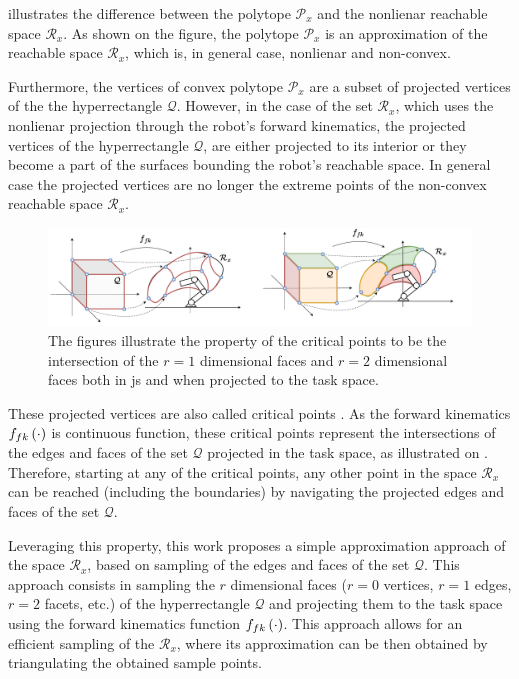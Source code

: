  illustrates the difference between the polytope $\mathcal{P}_x$ and the nonlienar reachable space $\mathcal{R}_x$. As shown on the figure, the polytope $\mathcal{P}_x$ is an approximation of the reachable space $\mathcal{R}_x$, which is, in general case, nonlienar and non-convex. 

Furthermore, the vertices of convex polytope $\mathcal{P}_x$ are a subset of projected vertices of the the hyperrectangle $\mathcal{Q}$. However, in the case of the set $\mathcal{R}_x$, which uses the nonlienar projection through the robot's forward kinematics, the projected vertices of the hyperrectangle $\mathcal{Q}$, are either projected to its interior or they become a part of the surfaces bounding the robot's reachable space. In general case the projected vertices are no longer the extreme points of the non-convex reachable space $\mathcal{R}_x$. 

\begin{figure}[!h]
    \centering
    \includegraphics[width=\textwidth]{Papers/images/curved_space_algo_new_critical.pdf}
    \caption{The figures illustrate the property of the critical points to be the intersection of the $r=1$ dimensional faces and $r=2$ dimensional faces both in \gls{js} and when projected to the task space.}
    \label{fig:curved_space_algo_new_critical}
\end{figure}

These projected vertices are also called critical points \cite{MERLET1998critical}. As the forward kinematics $f_{fk}\left(\cdot\right)$ is continuous function, these critical points represent the intersections of the edges and faces of the set $\mathcal{Q}$ projected in the task space, as illustrated on . Therefore, starting at any of the critical points, any other point in the space $\mathcal{R}_x$ can be reached (including the boundaries) by navigating the projected edges and faces of the set $\mathcal{Q}$. 


Leveraging this property, this work proposes a simple approximation approach of the space $\mathcal{R}_x$, based on sampling of the edges and faces of the set $\mathcal{Q}$.
This approach consists in sampling the $r$ dimensional faces ($r=0$ vertices, $r=1$ edges, $r=2$ facets, etc.) of the hyperrectangle $\mathcal{Q}$ and projecting them to the task space using the forward kinematics function $f_{fk}\left(\cdot\right)$. This approach allows for an efficient sampling of the $\mathcal{R}_x$, where its approximation can be then obtained by triangulating the obtained sample points. 

